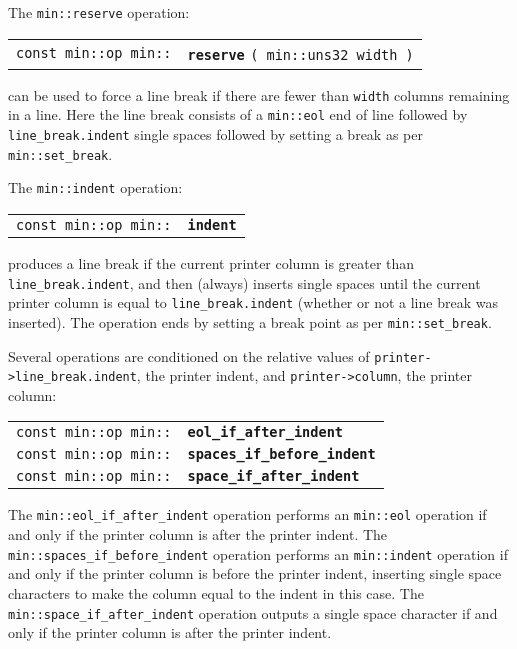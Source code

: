\documentclass[12pt]{article}
\makeatletter
\newcommand{\ttindex}[1]{\index{#1@{\tt #1}}}
\newcommand{\minindex}[1]{\ttindex{min::#1}\ttindex{#1}}
\newcommand{\EOL}{\penalty \exhyphenpenalty}
\newenvironment{indpar}[1][0.3in]%
	{\begin{list}{}%
		     {\setlength{\itemsep}{0in}%
		      \setlength{\topsep}{0in}%
		      \setlength{\parsep}{1ex}%
		      \setlength{\labelwidth}{#1}%
		      \setlength{\leftmargin}{#1}%
		      \addtolength{\leftmargin}{\labelsep}}%
	 \item}%
	{\end{list}}
\newcommand{\LABEL}[1]{\label{#1}}
\newcommand{\MINKEY}[1]{{\tt \bf #1}\minindex{#1}}
\makeatother
\begin{document}
The {\tt min::reserve} operation:

\begin{indpar}[1em]\begin{tabular}{r@{}l}
\verb|const min::op min::| & \MINKEY{reserve} \verb|( min::uns32 width )|
\LABEL{MIN::RESERVE} \\
\end{tabular}\end{indpar}

can be used to force a line break if there are fewer than {\tt width}
columns remaining in a line.
Here the line break consists of a {\tt min::eol} end of line followed
by {\tt line\_\EOL break.indent} single spaces followed by setting a break
as per {\tt min::\EOL set\_\EOL break}.

The {\tt min::indent} operation:

\begin{indpar}[1em]\begin{tabular}{r@{}l}
\verb|const min::op min::| & \MINKEY{indent}
\LABEL{MIN::INDENT} \\
\end{tabular}\end{indpar}

produces a line break if the current printer
column is greater than {\tt line\_\EOL break.indent}, and then (always) inserts
single spaces until the current printer column is equal to
{\tt line\_\EOL break.indent} (whether or not a line break was inserted).
The operation
ends by setting a break point as per {\tt min::\EOL set\_\EOL break}.

Several operations are conditioned on the relative values of
{\tt printer->\EOL line\_\EOL break.indent}, the printer indent,
and {\tt printer->\EOL column}, the printer column:

\begin{indpar}[1em]\begin{tabular}{r@{}l}
\verb|const min::op min::| & \MINKEY{eol\_\EOL if\_\EOL after\_\EOL indent}
\LABEL{MIN::EOL_IF_AFTER_INDENT} \\
\verb|const min::op min::| & \MINKEY{spaces\_\EOL if\_\EOL before\_\EOL indent}
\LABEL{MIN::SPACES_IF_BEFORE_INDENT} \\
\verb|const min::op min::| & \MINKEY{space\_\EOL if\_\EOL after\_\EOL indent}
\LABEL{MIN::SPACE_IF_AFTER_INDENT} \\
\end{tabular}\end{indpar}

The {\tt min::eol\_\EOL if\_\EOL after\_\EOL indent} operation performs
an {\tt min::eol} operation if and only if the printer column is after
the printer indent.
The {\tt min::spaces\_\EOL if\_\EOL before\_\EOL indent} operation performs
an {\tt min::indent} operation if and only if the printer column is before
the printer indent, inserting single space characters to make the
column equal to the indent in this case.
The {\tt min::space\_\EOL if\_\EOL after\_\EOL indent} operation outputs
a single space character if and only if the printer column is after
the printer indent.
\end{document}
